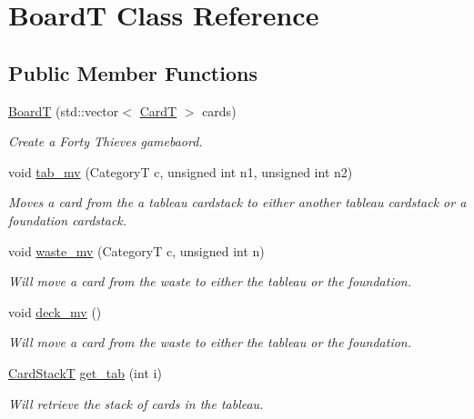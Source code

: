 \hypertarget{class_board_t}{}\section{BoardT Class Reference}
\label{class_board_t}
\subsection*{Public Member Functions}
\begin{DoxyCompactItemize}
\item 
\hyperlink{class_board_t_a140c2de28c7308b08c0d736d671fc299}{BoardT} (std\+::vector$<$ \hyperlink{struct_card_t}{CardT} $>$ cards)
\begin{DoxyCompactList}\small\item\em Create a Forty Thieves gamebaord. \end{DoxyCompactList}\item 
void \hyperlink{class_board_t_a0c55adc3925fe48ae0672d29d975aac4}{tab\+\_\+mv} (CategoryT c, unsigned int n1, unsigned int n2)
\begin{DoxyCompactList}\small\item\em Moves a card from the a tableau cardstack to either another tableau cardstack or a foundation cardstack. \end{DoxyCompactList}\item 
void \hyperlink{class_board_t_a2656775270574758d508b3e6b026d711}{waste\+\_\+mv} (CategoryT c, unsigned int n)
\begin{DoxyCompactList}\small\item\em Will move a card from the waste to either the tableau or the foundation. \end{DoxyCompactList}\item 
void \hyperlink{class_board_t_a548e3e518666a6f38b49e072a88a6d2c}{deck\+\_\+mv} ()
\begin{DoxyCompactList}\small\item\em Will move a card from the waste to either the tableau or the foundation. \end{DoxyCompactList}\item 
\hyperlink{class_stack}{Card\+StackT} \hyperlink{class_board_t_af7157e485cd48aa4c3f52d391af1fef3}{get\+\_\+tab} (int i)
\begin{DoxyCompactList}\small\item\em Will retrieve the stack of cards in the tableau. \end{DoxyCompactList}\item 

\end{DoxyCompactItemize}
